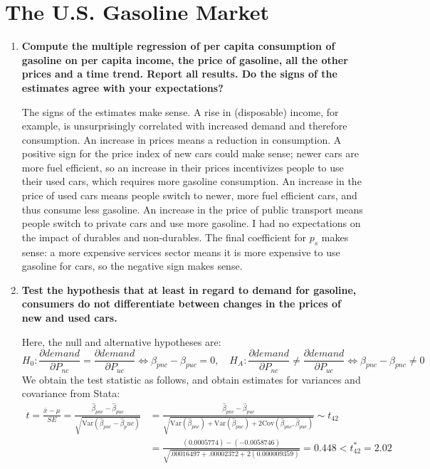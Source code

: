 \documentclass{article}
\begin{document}
\newpage
\section{The U.S. Gasoline Market}

\begin{enumerate}[label=\alph*.]
\item \textbf{Compute the multiple regression of per capita consumption of gasoline on per capita income, the price of gasoline, all the other prices and a time trend. Report all results. Do the signs of the estimates agree with your expectations?}


The signs of the estimates make sense. A rise in (disposable) income, for example, is unsurprisingly correlated with increased demand and therefore consumption. An increase in prices means a reduction in consumption. A positive sign for the price index of new cars could make sense; newer cars are more fuel efficient, so an increase in their prices incentivizes people to use their used cars, which requires more gasoline consumption. An increase in the price of used cars means people switch to newer, more fuel efficient cars, and thus consume less gasoline. An increase in the price of public transport means people switch to private cars and use more gasoline. I had no expectations on the impact of durables and non-durables. The final coefficient for $p_s$ makes sense: a more expensive services sector means it is more expensive to use gasoline for cars, so the negative sign makes sense.
\item \textbf{Test the hypothesis that at least in regard to demand for gasoline, consumers do not differentiate between changes in the prices of new and used cars.}

Here, the null and alternative hypotheses are:
$$ H_0:\frac{\partial demand}{\partial P_{nc}}=\frac{\partial demand}{\partial P_{uc}} \iff \beta_{pnc} - \beta_{puc} =0, \quad H_A: \frac{\partial demand}{\partial P_{nc}} \neq \frac{\partial demand}{\partial P_{uc}} \iff \beta_{pnc} - \beta_{pnc} \neq 0$$
We obtain the test statistic as follows, and obtain estimates for variances and covariance from Stata:
\begin{align*}
t = \frac{\bar{x}-\mu}{SE} =  \frac{\hat{\beta}_{pnc}-  \hat{\beta}_{puc}}{\sqrt{{\text{Var}}(\hat{\beta}_{pnc} - \hat{\beta}_puc)}} & = \frac{\hat{\beta}_{pnc} - \hat{\beta}_{puc}}{\sqrt{ {\text{Var}(\hat{\beta}_{pnc})}  + {\text{Var}(\hat{\beta}_{puc})} + 2 { \text{Cov}(\hat{\beta}_{pnc}, \hat{\beta}_{puc})  }  }    } \sim t_{42}  \\
& = \frac{(0.0005774) - (-0.0058746)}{\sqrt{.00016497 + .00002372 + 2(0.000009359)}} = 0.448 < t_{42}^{*} = 2.02
\end{align*}
	

\end{enumerate}
\end{document}
